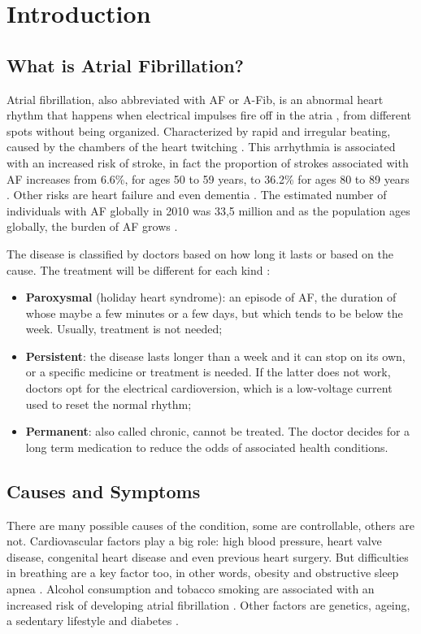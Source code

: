 \chapter{Introduction}
\label{sec:introduction}

\section{What is Atrial Fibrillation?}
Atrial fibrillation, also abbreviated with AF or A-Fib, is an abnormal heart rhythm that happens when electrical impulses fire off in the atria , from different spots without being organized. Characterized by rapid and irregular beating, caused by the chambers of the heart twitching \cite{cdcgov17}. This arrhythmia is associated with an increased risk of stroke, in fact the proportion of strokes associated with AF increases from 6.6\%, for ages 50 to 59 years, to 36.2\% for ages 80 to 89 years \cite{10.1001/archinte.1987.00370090041008}. Other risks are heart failure and even dementia \cite{Munger2014}. The estimated number of individuals with AF globally in 2010 was 33,5 million and as the population ages globally, the burden of AF grows \cite{doi:10.1161/CIRCULATIONAHA.113.005119}.


The disease is classified by doctors based on how long it lasts or based on the cause. The treatment will be different for each kind \cite{webmd2018}:
\begin{itemize}
  \item \textbf{Paroxysmal} (holiday heart syndrome): an episode of AF, the duration of whose maybe a few minutes or a few days, but which tends to be below the week. Usually, treatment is not needed;
  \item \textbf{Persistent}: the disease lasts longer than a week and it can stop on its own, or a specific medicine or treatment is needed. If the latter does not work, doctors opt for the electrical cardioversion, which is a low-voltage current used to reset the normal rhythm;
  \item \textbf{Permanent}: also called chronic, cannot be treated. The doctor decides for a long term medication to reduce the odds of associated health conditions.
\end{itemize}

\section{Causes and Symptoms}
There are many possible causes of the condition, some are controllable, others are not. Cardiovascular factors play a big role: high blood pressure, heart valve disease, congenital heart disease and even previous heart surgery. But difficulties in breathing are a key factor too, in other words, obesity and obstructive sleep apnea \cite{doi:10.1111/obr.12056}. Alcohol consumption and tobacco smoking are associated with an increased risk of developing atrial fibrillation \cite{Tonelo2013, DU20171968}. Other factors are genetics, ageing, a sedentary lifestyle and diabetes \cite{10.1001/jama.291.23.2851, Staerk2017}.

